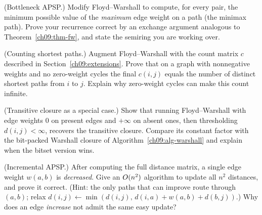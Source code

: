 \begin{exercise}
(Bottleneck APSP.) Modify Floyd--Warshall to compute, for every pair, the minimum possible value of the
\emph{maximum} edge weight on a path (the minimax path). Prove your recurrence correct by an exchange
argument analogous to Theorem~\ref{ch09:thm-fw}, and state the semiring you are working over.
\end{exercise}

\begin{exercise}
(Counting shortest paths.) Augment Floyd--Warshall with the count matrix $c$ described in
Section~\ref{ch09:extensions}. Prove that on a graph with nonnegative weights and no zero-weight cycles
the final $c(i,j)$ equals the number of distinct shortest paths from $i$ to $j$. Explain why zero-weight
cycles can make this count infinite.
\end{exercise}

\begin{exercise}
(Transitive closure as a special case.) Show that running Floyd--Warshall with edge weights $0$ on
present edges and $+\infty$ on absent ones, then thresholding $d(i,j)<\infty$, recovers the transitive
closure. Compare its constant factor with the bit-packed Warshall closure of
Algorithm~\ref{ch09:alg-warshall} and explain when the bitset version wins.
\end{exercise}

\begin{exercise}
(Incremental APSP.) After computing the full distance matrix, a single edge weight $w(a,b)$ is
\emph{decreased}. Give an $O(n^2)$ algorithm to update all $n^2$ distances, and prove it correct.
(Hint: the only paths that can improve route through $(a,b)$; relax
$d(i,j)\leftarrow\min(d(i,j),\,d(i,a)+w(a,b)+d(b,j))$.) Why does an edge \emph{increase} not admit the
same easy update?
\end{exercise}
